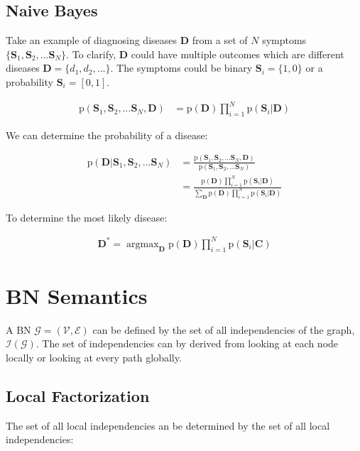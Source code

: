 \documentclass[11pt]{article}
\newcommand{\SetOf}[1]{\mathbf{#1}} %
\newcommand{\prob}[1]{\text{p}(#1)} %
\DeclareMathOperator*{\argmax}{argmax}
\newcommand{\Eq}[1]{\begin{align*}#1\end{align*}} %
\newcommand{\cursive}[1]{\mathcal{#1}}
\begin{document}
\subsection{Naive Bayes}

	Take an example of diagnosing diseases $\SetOf{D}$ from a set of $N$ symptoms $\{\SetOf{S}_1,\SetOf{S}_2,...\SetOf{S}_N\}$. To clarify,  $\SetOf{D}$ could have multiple outcomes which are different diseases $\SetOf{D} = \{d_1,d_2,...\}$. The symptoms could be binary $\SetOf{S}_i = \{1,0\}$ or a probability $\SetOf{S}_i = [0,1]$.

	\begin{center}
	\end{center}


	\Eq{\prob{\SetOf{S}_1,\SetOf{S}_2,...\SetOf{S}_N,\SetOf{D}}&=\prob{\SetOf{D}}\prod_{i=1}^N \prob{\SetOf{S}_i|\SetOf{D}}}

	We can determine the probability of a disease:

	\Eq{\prob{\SetOf{D}|\SetOf{S}_1,\SetOf{S}_2,...\SetOf{S}_N}&=\frac{\prob{\SetOf{S}_1,\SetOf{S}_2,...\SetOf{S}_N,\SetOf{D}}}{\prob{\SetOf{S}_1,\SetOf{S}_2,...\SetOf{S}_N}}\\&=\frac{\prob{\SetOf{D}}\prod_{i=1}^N \prob{\SetOf{S}_i|\SetOf{D}}}{\sum_{\SetOf{D}} \prob{\SetOf{D}}\prod_{i=1}^N \prob{\SetOf{S}_i|\SetOf{D}} }}

	To determine the most likely disease:

	\Eq{\SetOf{D}^* = \argmax_{\SetOf{D}} \prob{\SetOf{D}}\prod_{i=1}^{N}\prob{\SetOf{S}_i|\SetOf{C}}}

\section{BN Semantics}
	A BN $\cursive{G} = (\cursive{V},\cursive{E})$ can be defined by the set of all independencies of the graph, $\cursive{I}(\cursive{G})$. The set of independencies can by derived from looking at each node locally or looking at every path globally.

	\subsection{Local Factorization}
	The set of all local independencies an be determined by the set of all local independencies:
\end{document}
